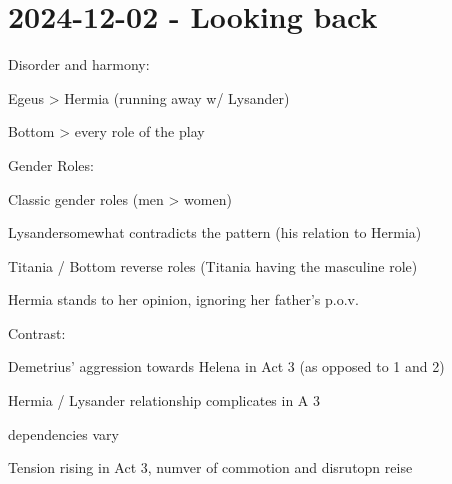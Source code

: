 \section{2024-12-02 - Looking back}

\startitemize
\item Disorder and harmony:
\startitemize[packed]
\item Egeus > Hermia (running away w/ Lysander)
\item Bottom > every role of the play
\stopitemize
\item Gender Roles:
\startitemize[packed]
\item Classic gender roles (men > women)
\item Lysandersomewhat contradicts the pattern (his relation to Hermia)
\item Titania / Bottom reverse roles (Titania having the masculine role)
\item Hermia stands to her opinion, ignoring her father's p.o.v.
\stopitemize
\item Contrast:
\startitemize[packed]
\item Demetrius' aggression towards Helena in Act 3 (as opposed to 1 and 2)
\item Hermia / Lysander relationship complicates in A 3
\item dependencies vary
\stopitemize
\stopitemize

\startframedtext
Tension rising in Act 3, numver of commotion and disrutopn reise
\stopframedtext
